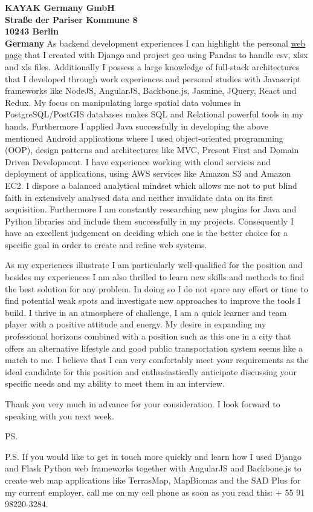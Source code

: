 \documentclass[a4paper]{joaosoares-letter}
\begin{document}
\begin{letter}{\bfseries KAYAK Germany GmbH\\Straße der Pariser Kommune 8\\10243 Berlin\\Germany}
As backend development experiences I can highlight the personal \href{https://goo.gl/wrN029}{web page} that I created with Django and project geo using Pandas to handle csv, xlsx and xls files. Additionally I possess a large knowledge of full-stack architectures that I developed through work experiences and personal studies with Javascript frameworks like NodeJS, AngularJS, Backbone.js, Jasmine, JQuery, React and Redux. My focus on manipulating large spatial data volumes in PostgreSQL/PostGIS databases makes SQL and Relational powerful tools in my hands. Furthermore I applied Java successfully in developing the above mentioned Android applications where I used object-oriented programming (OOP), design patterns and architectures like MVC, Present First and Domain Driven Development. I have experience working with cloud services and deployment of applications, using AWS services like Amazon S3 and Amazon EC2. I dispose a balanced analytical mindset which allows me not to put blind faith in extensively analysed data and neither invalidate data on its first acquisition. Furthermore I am constantly researching new plugins for Java and Python libraries and include them successfully in my projects. Consequently I have an excellent judgement on deciding which one is the better choice for a specific goal in order to create and refine web systems.

As my experiences illustrate I am particularly well-qualified for the position and besides my experiences I am also thrilled to learn new skills and methods to find the best solution for any problem. In doing so I do not spare any effort or time to find potential weak spots and investigate new approaches to improve the tools I build. I thrive in an atmosphere of challenge, I am a quick learner and team player with a positive attitude and energy. My desire in expanding my professional horizons combined with a position such as this one in a city that offers an alternative lifestyle and good public transportation system seems like a match to me. I believe that I can very comfortably meet your requirements as the ideal candidate for this position and enthusiastically anticipate discussing your specific needs and my ability to meet them in an interview.

\closing{Thank you very much in advance for your consideration. I look forward to speaking with you next week.}
\vspace{10pt}
\ps

P.S. If you would like to get in touch more quickly and learn how I used Django and Flask Python web frameworks together with AngularJS and Backbone.js to create web map applications like TerrasMap, MapBiomas and the SAD Plus for my current employer, call me on my cell phone as soon as you read this: + 55 91 98220-3284.
\vspace{\fill}

\end{letter}
\end{document}
